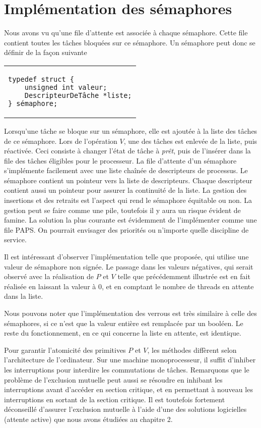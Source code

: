 \section{Implémentation des sémaphores}
Nous avons vu qu'une file d'attente est associée à chaque sémaphore. Cette file contient toutes les tâches bloquées sur ce sémaphore.  Un sémaphore peut donc se définir de la façon suivante
\begin{center}
\begin{tabular}{l}
\begin{lstlisting}
typedef struct {
	unsigned int valeur;
	DescripteurDeTâche *liste;
} sémaphore;
\end{lstlisting}
\end{tabular}
\end{center}
Lorsqu'une tâche se bloque sur un sémaphore, elle est ajoutée à la liste des tâches de ce sémaphore. Lors de l'opération $V$, une des tâches est enlevée de la liste, puis réactivée. Ceci consiste à changer l'état de tâche à {\em prêt}, puis de l'insérer dans la file des tâches éligibles pour le processeur. La file d'attente d'un sémaphore s'implémente facilement avec une liste chaînée de descripteurs de processus. Le sémaphore contient un pointeur vers la liste de descripteurs.  Chaque descripteur contient aussi un pointeur pour assurer la continuité de la liste. La gestion des insertions et des retraits est l'aspect qui rend le sémaphore équitable ou non.  La gestion peut se faire comme une pile, toutefois il y aura un risque évident de famine.  La solution la plus courante est évidemment de l'implémenter comme une file PAPS.  On pourrait envisager des priorités ou n'importe quelle discipline de service.
\par
Il est intéressant d'observer l'implémentation telle que proposée, qui utilise une valeur de sémaphore non signée. Le passage dans les valeurs négatives, qui serait observé avec la réalisation de $P$ et $V$ telle que précédemment illustrée est en fait réalisée en laissant la valeur à 0, et en comptant le nombre de threads en attente dans la liste.
\par
Nous pouvons noter que l'implémentation des verrous est très similaire à celle des sémaphores, si ce n'est que la valeur entière est remplacée par un booléen. Le reste du fonctionnement, en ce qui concerne la liste en attente, est identique.
\par
Pour garantir l'atomicité des primitives $P$ et $V$, les méthodes diffèrent selon l'architecture de l'ordinateur.
Sur une machine monoprocesseur, il suffit d'inhiber les interruptions pour interdire les commutations de tâches.  Remarquons que le problème de l'exclusion mutuelle peut aussi se résoudre en inhibant les interruptions avant d'accéder en section critique, et en permettant à nouveau les interruptions en sortant de la section critique.
Il est toutefois fortement déconseillé d'assurer l'exclusion mutuelle à l'aide d'une des solutions logicielles (attente active) que nous avons étudiées au chapitre 2.

